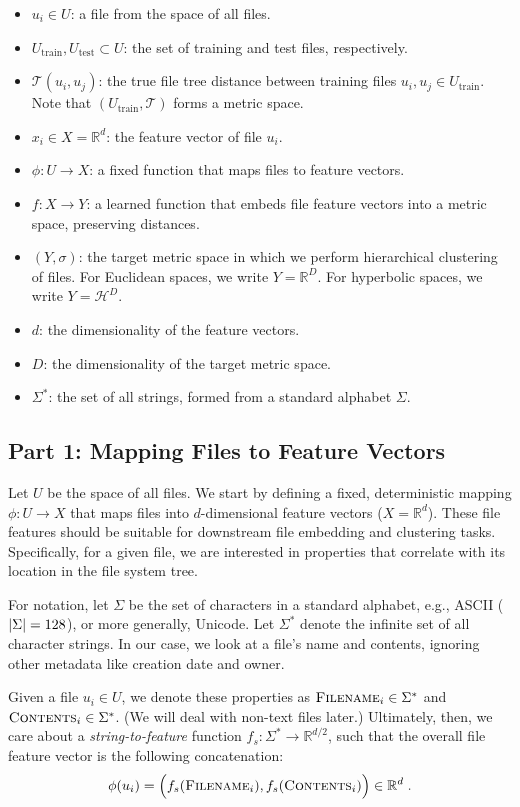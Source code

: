 \documentclass{article}
\begin{document}
\begin{itemize}
  \item $u_i \in U$: a file from the space of all files.
  \item $U_\text{train}, U_\text{test} \subset U$: the set of training and test files, respectively.
  \item $\mathcal T(u_i, u_j)$: the true file tree distance between training files $u_i, u_j \in U_\text{train}$. Note that $(U_\text{train}, \mathcal T)$ forms a metric space.
  \item $x_i \in X = \mathbb{R}^d$: the feature vector of file $u_i$.
  \item $\phi: U \to X$: a fixed function that maps files to feature vectors.
  \item $f: X \to Y$: a learned function that embeds file feature vectors into a metric space, preserving distances.
  \item $(Y, \sigma)$: the target metric space in which we perform hierarchical clustering of files. For Euclidean spaces, we write $Y = \mathbb R^D$. For hyperbolic spaces, we write $Y = \mathcal H^D$.
  \item $d$: the dimensionality of the feature vectors.
  \item $D$: the dimensionality of the target metric space.
  \item $\Sigma^*$: the set of all strings, formed from a standard alphabet $\Sigma$.
\end{itemize}

\subsection{Part 1: Mapping Files to Feature Vectors}

Let $U$ be the space of all files. We start by defining a fixed, deterministic mapping $\phi: U \to X$ that maps files into $d$-dimensional feature vectors ($X = \mathbb R^d$). These file features should be suitable for downstream file embedding and clustering tasks. Specifically, for a given file, we are interested in properties that correlate with its location in the file system tree.

For notation, let $\Sigma$ be the set of characters in a standard alphabet, e.g., ASCII ($\abs{\Sigma} = 128$), or more generally, Unicode. Let $\Sigma^*$ denote the infinite set of all character strings. In our case, we look at a file's name and contents, ignoring other metadata like creation date and owner.

Given a file $u_i \in U$, we denote these properties as $\textsc{Filename}_i \in \Sigma^*$ and $\textsc{Contents}_i \in \Sigma^*$. (We will deal with non-text files later.) Ultimately, then, we care about a \emph{string-to-feature} function $f_s: \Sigma^* \to \mathbb R^{d/2}$, such that the overall file feature vector is the following concatenation:
\begin{align}
  \phi(u_i) =
  \Big( f_s(\textsc{Filename}_i), f_s(\textsc{Contents}_i) \Big) \in \mathbb R^d \; .
\end{align}
\end{document}
